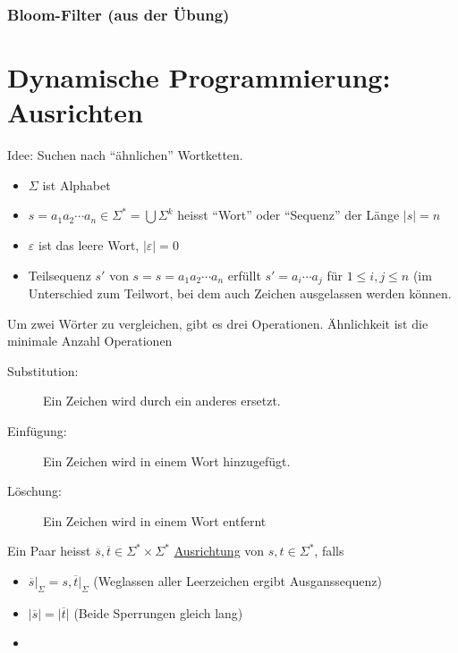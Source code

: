 \documentclass{scrartcl}
\begin{document}

\subsubsection{Bloom-Filter {\tiny (aus der Übung)}}


\section{Dynamische Programmierung: Ausrichten}
Idee: Suchen nach "`ähnlichen"' Wortketten.
\begin{shaded}
\begin{itemize}
	\item $\Sigma$ ist Alphabet
	\item $s=a_1a_2\cdots a_n\in\Sigma^*=\bigcup \Sigma^k$ heisst "`Wort"' oder "`Sequenz"' der Länge $\vert s\vert=n$
	\item $\varepsilon$ ist das leere Wort, $\vert\varepsilon\vert=0$
	\item Teilsequenz $s'$ von $s=s=a_1a_2\cdots a_n$ erfüllt $s'=a_i\cdots a_j$ für $1\leq i,j\leq n$ (im Unterschied zum Teilwort, bei dem auch Zeichen ausgelassen werden können.
\end{itemize}
\vspace{2em}
Um zwei Wörter zu vergleichen, gibt es drei Operationen. Ähnlichkeit ist die minimale Anzahl Operationen
\begin{description}
	\item[Substitution:] Ein Zeichen wird durch ein anderes ersetzt.
	\item[Einfügung:] Ein Zeichen wird in einem Wort hinzugefügt.
	\item[Löschung:] Ein Zeichen wird in einem Wort entfernt
\end{description}
\vspace{2em}

Ein Paar heisst $\overline{s},\overline{t}\in\Sigma^*\times\Sigma^*$ \underline{Ausrichtung} von $s,t\in\Sigma^*$, falls
\begin{itemize}
	\item $\overline{s}\vert_\Sigma=s,\overline{t}\vert_\Sigma$ {\tiny (Weglassen aller Leerzeichen ergibt Ausganssequenz)}
	\item $\vert\overline{s}\vert=\vert\overline{t}\vert$ {\tiny (Beide Sperrungen gleich lang)}
	\item {}
\end{itemize}
\vspace{2em}
\end{shaded}
\end{document}
